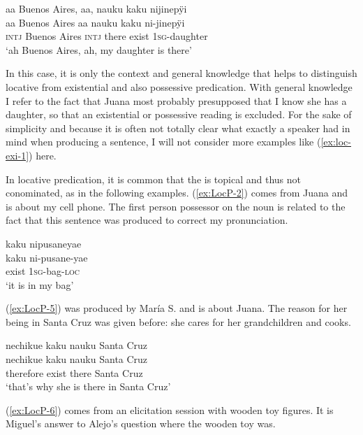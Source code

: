 \ea\label{ex:loc-exi-1}
\begingl
\glpreamble aa Buenos Aires, aa, nauku kaku nijinepÿi\\
\gla aa {Buenos Aires} aa nauku kaku ni-jinepÿi\\
\glb \textsc{intj} {Buenos Aires} \textsc{intj} there exist 1\textsc{sg}-daughter\\
\glft ‘ah Buenos Aires, ah, my daughter is there’
\endgl
\trailingcitation{[jxx-p110923l-1.104-107]}
\xe

In this case, it is only the context and general knowledge that helps to distinguish locative from existential and also possessive predication. With general knowledge I refer to the fact that Juana most probably presupposed that I know she has a daughter, so that an existential or possessive reading is excluded. For the sake of simplicity and because it is often not totally clear what exactly a speaker had in mind when producing a sentence, I will not consider more examples like (\ref{ex:loc-exi-1}) here.

In locative predication, it is common that the  is topical and thus not conominated, as in the following examples. (\ref{ex:LocP-2}) comes from Juana and is about my cell phone. The first person possessor on the noun is related to the fact that this sentence was produced to correct my pronunciation.

\ea\label{ex:LocP-2}
\begingl 
\glpreamble kaku nipusaneyae\\
\gla kaku ni-pusane-yae \\ 
\glb exist 1\textsc{sg}-bag-\textsc{loc}\\ 
\glft ‘it is in my bag’\\ 
\endgl
\trailingcitation{[jxx-p110923l-2.040]}
\xe

(\ref{ex:LocP-5}) was produced by María S. and is about Juana. The reason for her being in Santa Cruz was given before: she cares for her grandchildren and cooks.

\ea\label{ex:LocP-5}
\begingl
\glpreamble nechikue kaku nauku Santa Cruz\\
\gla nechikue kaku nauku {Santa Cruz}\\
\glb therefore exist there {Santa Cruz}\\
\glft ‘that’s why she is there in Santa Cruz’
\endgl
\trailingcitation{[rxx-e120511l.120]}
\xe

(\ref{ex:LocP-6}) comes from an elicitation session with wooden toy figures. It is Miguel’s answer to Alejo’s question where the wooden toy was.

